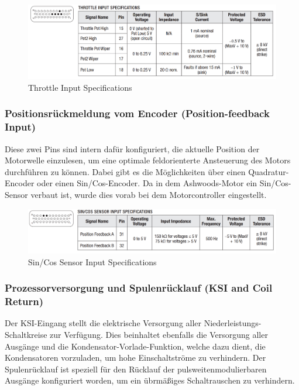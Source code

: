 \begin{figure}[H]
	\begin{center}
		\includegraphics[width=\textwidth]{figures/antrieb/Throttle_Input_Specifications.png}
		\caption{Throttle Input Specifications}
	\end{center}
\end{figure}



\subsubsection{Positionsrückmeldung vom Encoder (Position-feedback Input)}
Diese zwei Pins sind intern dafür konfiguriert, die aktuelle Position der Motorwelle einzulesen, um eine optimale feldorienterte Ansteuerung des Motors durchführen zu können. Dabei gibt es die Möglichkeiten über einen Quadratur-Encoder oder einen Sin/Cos-Encoder. Da in dem Ashwoods-Motor ein Sin/Cos-Sensor verbaut ist, wurde dies vorab bei dem Motorcontroller eingestellt.

\begin{figure}[H]
	\begin{center}
		\includegraphics[width=\textwidth]{figures/antrieb/SinCosSensor_Input_Specifications.png}
		\caption{Sin/Cos Sensor Input Specifications}
	\end{center}
\end{figure}


\newpage


\subsubsection{Prozessorversorgung und Spulenrücklauf (KSI and Coil Return)}
Der KSI-Eingang stellt die elektrische Versorgung aller Niederleistungs-Schaltkreise zur Verfügung. Dies  beinhaltet ebenfalls die Versorgung aller Ausgänge und die Kondensator-Vorlade-Funktion, welche dazu dient, die Kondensatoren vorzuladen, um hohe Einschaltströme zu verhindern. Der Spulenrücklauf ist speziell für den Rücklauf der pulsweitenmodulierbaren Ausgänge konfiguriert worden, um ein übrmäßiges Schaltrauschen zu verhindern.

